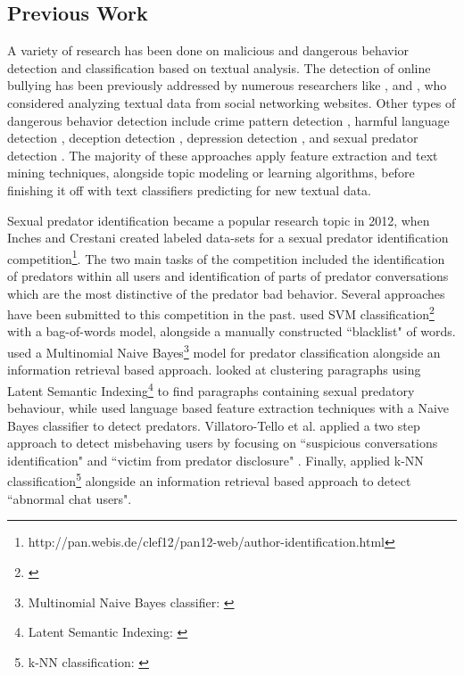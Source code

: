 \documentclass[11pt]{article}
\begin{document}
\subsection{Previous Work}
A variety of research has been done on malicious and dangerous behavior detection and classification based on textual analysis. The detection of online bullying has been previously addressed by numerous researchers like \cite{nandhini2015online}, and \cite{nalini2015classification}, who considered analyzing textual data from social networking websites. Other types of dangerous behavior detection include crime pattern detection \cite{nath2006crime}, harmful language detection \cite{munezero2013antisocial}, deception detection \cite{fuller2011investigation}, depression detection \cite{wang2013depression}, and sexual predator detection \cite{inches2012overview}. The majority of these approaches apply feature extraction and text mining techniques, alongside topic modeling or learning algorithms, before finishing it off with text classifiers predicting for new textual data.

Sexual predator identification became a popular research topic in 2012, when Inches and Crestani created labeled data-sets for a sexual predator identification competition\footnote{http://pan.webis.de/clef12/pan12-web/author-identification.html}. The two main tasks of the competition included the identification of predators within all users and identification of parts of predator conversations which are the most distinctive of the predator bad behavior. Several approaches have been submitted to this competition in the past. \cite{morris2012identifying} used SVM classification\footnote{\cite{cortes1995support}} with a bag-of-words model, alongside a manually constructed ``blacklist" of words. \cite{vilarinoinformation} used a Multinomial Naive Bayes\footnote{Multinomial Naive Bayes classifier: \cite{mccallum1998comparison}} model for predator classification alongside an information retrieval based approach. \cite{brooke2012paragraph} looked at clustering paragraphs using Latent Semantic Indexing\footnote{Latent Semantic Indexing: \cite{deerwester1990indexing}} to find paragraphs containing sexual predatory behaviour, while \cite{bogdanova2012impact} used language based feature extraction techniques with a Naive Bayes classifier to detect predators. Villatoro-Tello et al. applied a two step approach to detect misbehaving users by focusing on ``suspicious conversations identification" and ``victim from predator disclosure" \cite{villatoro2012two}. Finally, \cite{kang2012ir} applied k-NN classification\footnote{ k-NN classification: \cite{ripley2007pattern}} alongside an information retrieval based approach to detect ``abnormal chat users".
\end{document}
